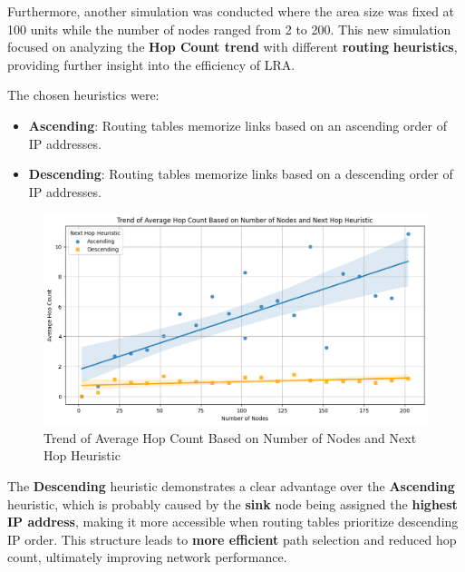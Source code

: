 \documentclass[../report.tex]{subfiles}
\begin{document}
Furthermore, another simulation was conducted where the area size was fixed at 100 units while the number of nodes ranged from 2 to 200. This new simulation focused on analyzing the \textbf{Hop Count trend} with different \textbf{routing} \textbf{heuristics}, providing further insight into the efficiency of LRA. \newline


The chosen heuristics were:
\begin{itemize}
    \item\textbf{Ascending}: Routing tables memorize links based on an ascending order of IP addresses.
    \item\textbf{Descending}: Routing tables memorize links based on a descending order of IP addresses.
\end{itemize}


\begin{figure}[H]
    \centering
    \includegraphics[width=1\linewidth]{images/hop_count.png}
    \caption{Trend of Average Hop Count Based on Number of Nodes and Next Hop Heuristic}
    \label{fig:enter-label}
\end{figure}

The \textbf{Descending} heuristic demonstrates a clear advantage over the \textbf{Ascending} heuristic, which is probably caused by the \textbf{sink} node being assigned the \textbf{highest IP address}, making it more accessible when routing tables prioritize descending IP order. This structure leads to \textbf{more efficient} path selection and reduced hop count, ultimately improving network performance.
\end{document}
